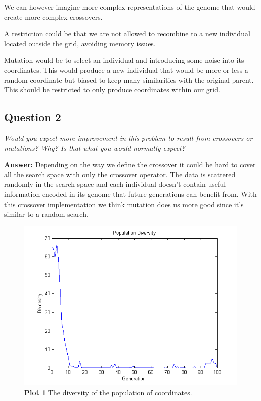 \documentclass[a4paper]{article}
\begin{document}
We can however imagine more complex representations of the genome that would create more complex crossovers.

A restriction could be that we are not allowed to recombine to a new individual located outside the grid, avoiding memory issues.

Mutation would be to select an individual and introducing some noise into its coordinates. This would produce a new individual that would be more or less a random coordinate but biased to keep many similarities with the original parent. This should be restricted to only produce coordinates within our grid. 

\subsection*{Question 2}
\emph{Would you expect more improvement in this problem to result
from crossovers or mutations? Why? Is that what you would normally expect?}

\textbf{Answer:} Depending on the way we define the crossover it could be hard to cover all the search space with only the crossover operator. The data is scattered randomly in the search space and each individual doesn't contain useful information encoded in its genome that future generations can benefit from. With this crossover implementation we think mutation does us more good since it's similar to a random search. 

\begin{figure}[H] %
	\includegraphics[scale=0.7]{populationDiversityStars.png}
	\caption{\label{fig:plot1Diversity}\textbf{Plot 1} The diversity of the population of coordinates.}
\end{figure}
\end{document}
